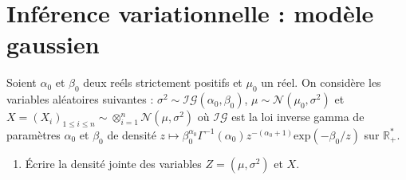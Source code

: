 \documentclass[a4paper,10pt,fleqn]{article}
\newcommand{\1}{\ensuremath{\mathbbm{1}}}
\begin{document}
\section{Inf\'erence variationnelle : mod\`ele gaussien}
Soient $\alpha_0$ et $\beta_0$ deux re\'els strictement positifs et $\mu_0$ un r\'eel. On consid\`ere les variables al\'eatoires suivantes : $\sigma^2 \sim\mathcal{IG}(\alpha_0,\beta_0)$, $\mu\sim\mathcal{N}(\mu_0,\sigma^2)$ et $X = (X_i)_{1\leq i\leq n}\sim\otimes_{i=1}^n\mathcal{N}(\mu,\sigma^2)$ o\`u $\mathcal{IG}$ est la loi inverse gamma de param\`etres $\alpha_0$ et $\beta_0$ de densit\'e $z\mapsto \beta_0^{\alpha_0}\Gamma^{-1}(\alpha_0)z^{-(\alpha_0+1)}\mathrm{exp}(-\beta_0/z)$ sur $\mathbb{R}_+^*$.
\begin{enumerate}
\item \'Ecrire la densit\'e jointe des variables $Z=(\mu,\sigma^2)$ et $X$.
%
%


\end{enumerate}
\end{document}
